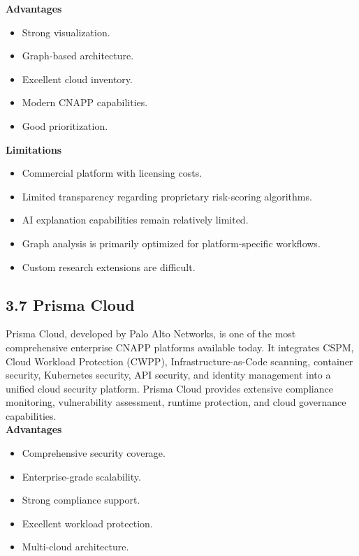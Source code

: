 \textbf{Advantages}

\begin{itemize}
\tightlist
\item
  Strong visualization.\\
\item
  Graph-based architecture.\\
\item
  Excellent cloud inventory.\\
\item
  Modern CNAPP capabilities.\\
\item
  Good prioritization.
\end{itemize}

\textbf{Limitations}

\begin{itemize}
\tightlist
\item
  Commercial platform with licensing costs.\\
\item
  Limited transparency regarding proprietary risk-scoring algorithms.\\
\item
  AI explanation capabilities remain relatively limited.\\
\item
  Graph analysis is primarily optimized for platform-specific workflows.\\
\item
  Custom research extensions are difficult.
\end{itemize}

\subsection{3.7 Prisma Cloud}

Prisma Cloud, developed by Palo Alto Networks, is one of the most comprehensive enterprise CNAPP platforms available today. It integrates CSPM, Cloud Workload Protection (CWPP), Infrastructure-as-Code scanning, container security, Kubernetes security, API security, and identity management into a unified cloud security platform. Prisma Cloud provides extensive compliance monitoring, vulnerability assessment, runtime protection, and cloud governance capabilities.\\
\textbf{Advantages}

\begin{itemize}
\tightlist
\item
  Comprehensive security coverage.\\
\item
  Enterprise-grade scalability.\\
\item
  Strong compliance support.\\
\item
  Excellent workload protection.\\
\item
  Multi-cloud architecture.
\end{itemize}

